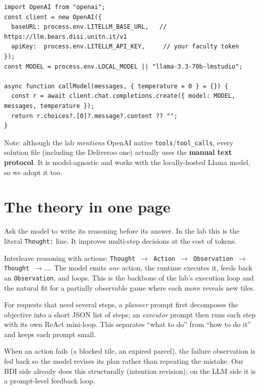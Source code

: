 \documentclass[11pt,a4paper]{article}
\begin{document}
\begin{keybox}
\begin{lstlisting}
import OpenAI from "openai";
const client = new OpenAI({
  baseURL: process.env.LITELLM_BASE_URL,   // https://llm.bears.disi.unitn.it/v1
  apiKey:  process.env.LITELLM_API_KEY,     // your faculty token
});
const MODEL = process.env.LOCAL_MODEL || "llama-3.3-70b-lmstudio";

async function callModel(messages, { temperature = 0 } = {}) {
  const r = await client.chat.completions.create({ model: MODEL, messages, temperature });
  return r.choices?.[0]?.message?.content ?? "";
}
\end{lstlisting}
\end{keybox}

\noindent Note: although the lab \emph{mentions} OpenAI native \texttt{tools}/\texttt{tool\_calls},
every solution file (including the Deliveroo one) actually uses the \textbf{manual text
protocol}. It is model-agnostic and works with the locally-hosted Llama model, so we adopt it too.

\section{The theory in one page}

\begin{description}[leftmargin=1.4em,style=nextline]
  \item[Chain-of-Thought (CoT).] Ask the model to write its reasoning before its answer.
  In the lab this is the literal \texttt{Thought:} line. It improves multi-step decisions at
  the cost of tokens.
  \item[ReAct (Reason + Act).] Interleave reasoning with actions:
  \texttt{Thought $\to$ Action $\to$ Observation $\to$ Thought $\to \dots$}. The model emits
  \emph{one} action, the runtime executes it, feeds back an \texttt{Observation}, and loops.
  This is the backbone of the lab's execution loop and the natural fit for a partially
  observable game where each move reveals new tiles.
  \item[Planner / Executor.] For requests that need several steps, a \emph{planner} prompt
  first decomposes the objective into a short JSON list of steps; an \emph{executor} prompt then
  runs each step with its own ReAct mini-loop. This separates ``what to do'' from ``how to do
  it'' and keeps each prompt small.
  \item[Reflexion / Replanning.] When an action fails (a blocked tile, an expired parcel),
  the failure observation is fed back so the model revises its plan rather than repeating the
  mistake. Our BDI side already does this structurally (intention revision); on the LLM side it
  is a prompt-level feedback loop.
\end{description}
\end{document}
